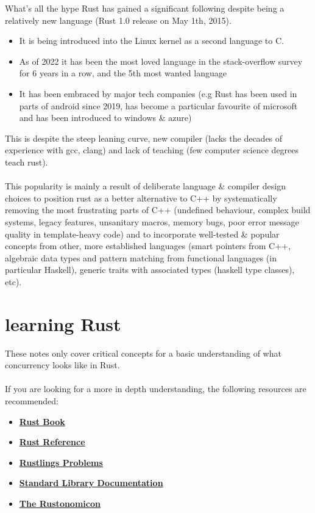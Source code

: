 \begin{sidenotebox}{What's all the hype}
    Rust has gained a significant following despite being a relatively new language (Rust 1.0 release on May 1th, 2015).
    \begin{itemize}
        \item It is being introduced into the Linux kernel as a second language to C.
        \item As of 2022 it has been the most loved language in the stack-overflow survey for 6 years in a row, and the 5th most wanted language
        \item It has been embraced by major tech companies (e.g Rust has been used in parts of android since 2019, has become a particular favourite of microsoft and has been introduced to windows \& azure)
    \end{itemize}
    This is despite the steep leaning curve, new compiler (lacks the decades of experience with gcc, clang) and lack of teaching (few computer science degrees teach rust).
    \\
    \\ This popularity is mainly a result of deliberate language \& compiler design choices to position rust as a better alternative to C++  by systematically removing the most frustrating parts of C++ (undefined behaviour, complex build systems, legacy features, unsanitary macros, memory bugs, poor error message quality in template-heavy code) and to incorporate well-tested \& popular concepts from other, more established languages (smart pointers from C++, algebraic data types and pattern matching from functional languages (in particular Haskell), generic traits with associated types (haskell type classes), etc).
\end{sidenotebox}

\section{learning Rust}
These notes only cover critical concepts for a basic understanding of what concurrency looks like in Rust.
\\
\\ If you are looking for a more in depth understanding, the following resources are recommended:
\begin{itemize}
    \item \href{https://doc.rust-lang.org/book/}{\textbf{Rust Book}}
    \item \href{https://doc.rust-lang.org/reference/}{\textbf{Rust Reference}}
    \item \href{https://github.com/rust-lang/rustlings}{\textbf{Rustlings Problems}}
    \item \href{https://doc.rust-lang.org/std/}{\textbf{Standard Library Documentation}}
    \item \href{https://doc.rust-lang.org/nomicon/}{\textbf{The Rustonomicon}}
\end{itemize}


